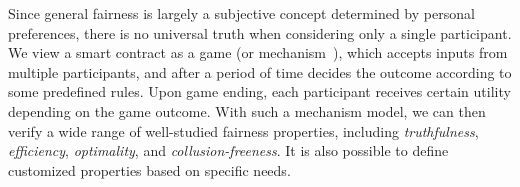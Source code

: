 %
Since general fairness is largely a subjective concept determined by personal preferences, there is
no universal truth when considering only a single participant.
We view a smart contract as a game (or mechanism~\cite{jackson2014mechanism,nisan2001algorithmic}),
which accepts inputs from multiple participants, and after a period of time decides the outcome
according to some predefined rules.
Upon game ending, each participant receives certain utility depending on the game outcome.
With such a mechanism model, we can then verify a wide range of well-studied fairness properties,
including \emph{truthfulness}, \emph{efficiency}, \emph{optimality}, and \emph{collusion-freeness}.
It is also possible to define customized properties based on specific needs.

